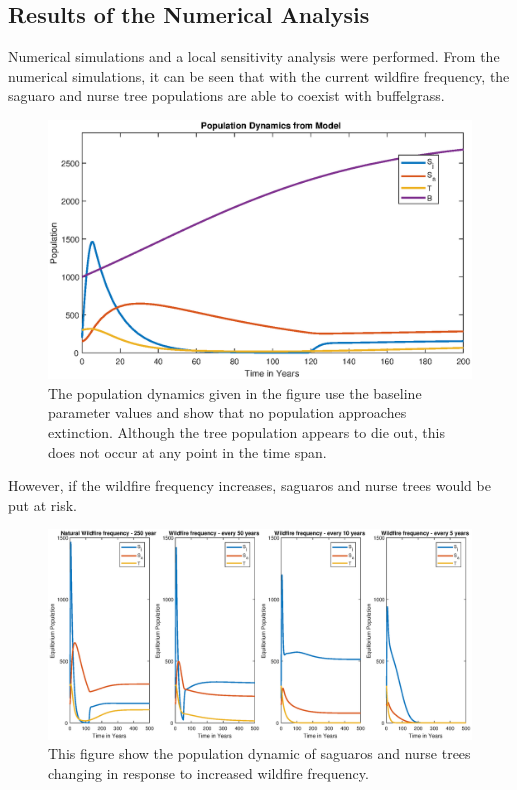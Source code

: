 \documentclass[size=custom,width=48 in,height=42 in, landscape]{sciposter}
\begin{document}
\begin{multicols}{3}
\section{Results of the Numerical Analysis}

Numerical simulations  and a local sensitivity analysis were performed. From the numerical simulations, it can be seen that with the current wildfire frequency, the saguaro and nurse tree populations are able to coexist with buffelgrass.\\

\vspace{-1cm}
\begin{figure}
\centering
\includegraphics[scale = 0.7]{buffelModel.eps}
\tiny{\caption{The population dynamics given in the figure use the baseline parameter values and show that no population approaches extinction. Although the tree population appears to die out, this does not occur at any point in the time span.}}
\end{figure}

However, if the wildfire frequency increases, saguaros and nurse trees would be put at risk.\\

\begin{figure}
\vspace{-1cm}
\centering
\includegraphics[scale = 0.6]{IncreasingWildfireFrequancy.eps}
\tiny{\caption{This figure show the population dynamic of saguaros and nurse trees changing in response to increased wildfire frequency.}}
\end{figure}


\end{multicols}
\end{document}
